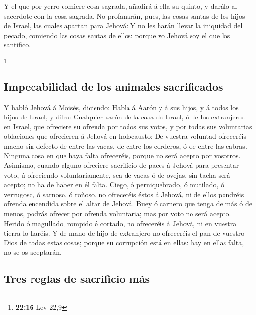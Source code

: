  Y el que por yerro comiere cosa sagrada, añadirá á ella
su quinto, y darálo al sacerdote con la cosa sagrada.  No
profanarán, pues, las cosas santas de los hijos de Israel, las cuales
apartan para Jehová:  Y no les harán llevar la iniquidad
del pecado, comiendo las cosas santas de ellos: porque yo Jehová soy el
que los santifico.

\footnote{\textbf{22:16} Lev 22,9}

\hypertarget{impecabilidad-de-los-animales-sacrificados}{%
\subsection{Impecabilidad de los animales
sacrificados}\label{impecabilidad-de-los-animales-sacrificados}}

 Y habló Jehová á Moisés, diciendo:  Habla
á Aarón y á sus hijos, y á todos los hijos de Israel, y diles: Cualquier
varón de la casa de Israel, ó de los extranjeros en Israel, que
ofreciere su ofrenda por todos sus votos, y por todas sus voluntarias
oblaciones que ofrecieren á Jehová en holocausto;  De
vuestra voluntad ofreceréis macho sin defecto de entre las vacas, de
entre los corderos, ó de entre las cabras.  Ninguna cosa
en que haya falta ofreceréis, porque no será acepto por vosotros.
 Asimismo, cuando alguno ofreciere sacrificio de paces á
Jehová para presentar voto, ú ofreciendo voluntariamente, sea de vacas ó
de ovejas, sin tacha será acepto; no ha de haber en él falta.
 Ciego, ó perniquebrado, ó mutilado, ó verrugoso, ó
sarnoso, ó roñoso, no ofreceréis éstos á Jehová, ni de ellos pondréis
ofrenda encendida sobre el altar de Jehová.  Buey ó
carnero que tenga de más ó de menos, podrás ofrecer por ofrenda
voluntaria; mas por voto no será acepto.  Herido ó
magullado, rompido ó cortado, no ofreceréis á Jehová, ni en vuestra
tierra lo haréis.  Y de mano de hijo de extranjero no
ofreceréis el pan de vuestro Dios de todas estas cosas; porque su
corrupción está en ellas: hay en ellas falta, no se os aceptarán.

\hypertarget{tres-reglas-de-sacrificio-muxe1s}{%
\subsection{Tres reglas de sacrificio
más}\label{tres-reglas-de-sacrificio-muxe1s}}


